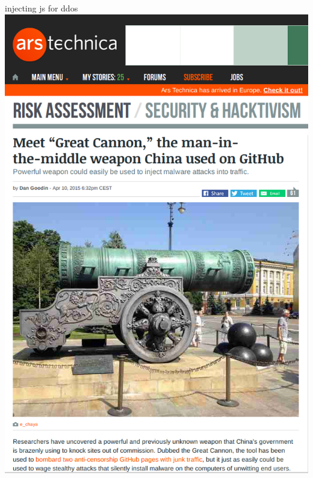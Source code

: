 \documentclass[11pt]{beamer}
\begin{document}
\begin{frame}{injecting js for ddos}
\includegraphics[scale=0.2]{great_canon.png}
\end{frame}
\end{document}
